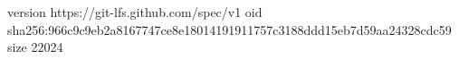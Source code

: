 version https://git-lfs.github.com/spec/v1
oid sha256:966c9c9eb2a8167747ce8e18014191911757c3188ddd15eb7d59aa24328cdc59
size 22024
